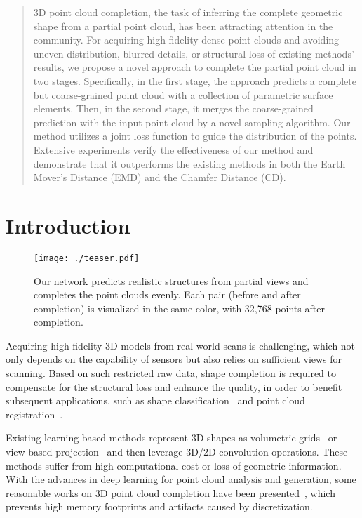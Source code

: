 \documentclass[letterpaper]{article} \usepackage{aaai20}  \usepackage{times}  \usepackage{helvet} \usepackage{courier}  \usepackage[hyphens]{url}  \usepackage{graphicx} \urlstyle{rm} \def\UrlFont{\rm}  \usepackage{graphicx}  \frenchspacing  \setlength{\pdfpagewidth}{8.5in}  \setlength{\pdfpageheight}{11in}  \usepackage{amsmath}
\author{Minghua Liu,\textsuperscript{\rm 1} Lu Sheng,\textsuperscript{\rm 2} Sheng Yang,\textsuperscript{\rm 3} Jing Shao,\textsuperscript{\rm 4} Shi-Min Hu\textsuperscript{\rm 3} \\
\textsuperscript{\rm 1}UC San Diego, 
\textsuperscript{\rm 2}Beihang University, 
\textsuperscript{\rm 3}Tsinghua University, 
\textsuperscript{\rm 4}Sensetime \\
minghua@ucsd.edu, lsheng@buaa.edu.cn, shengyang93fs@gmail.com,\\ shaojing@sensetime.com, shimin@tsinghua.edu.cn
}
\begin{document}
\maketitle

\begin{abstract}
3D point cloud completion, the task of inferring the complete geometric shape from a partial point cloud, has been attracting attention in the community. For acquiring high-fidelity dense point clouds and avoiding uneven distribution, blurred details, or structural loss of existing methods' results, we propose a novel approach to complete the partial point cloud in two stages. Specifically, in the first stage, the approach predicts a complete but coarse-grained point cloud with a collection of parametric surface elements. Then, in the second stage, it merges the coarse-grained prediction with the input point cloud by a novel sampling algorithm. Our method utilizes a joint loss function to guide the distribution of the points. Extensive experiments verify the effectiveness of our method and demonstrate that it outperforms the existing methods in both the Earth Mover's Distance (EMD) and the Chamfer Distance (CD). 
\end{abstract}

\section{Introduction}
\begin{figure}[t]
  \centering
  \texttt{[image: ./teaser.pdf]}
   \caption{
   Our network predicts realistic structures from partial views and completes the point clouds evenly. Each pair (before and after completion) is visualized in the same color, with 32,768 points after completion.}
   \label{denseresult}
\end{figure}
Acquiring high-fidelity 3D models from real-world scans is challenging, which not only depends on the capability of sensors but also relies on sufficient views for scanning. Based on such restricted raw data, shape completion is required to compensate for the structural loss and enhance the quality, in order to benefit subsequent applications, such as shape classification~\cite{Sarmad_2019_CVPR} and point cloud registration~\cite{yuan2018pcn}.

Existing learning-based methods represent 3D shapes as volumetric grids~\cite{dai2017shape,han2017high,Stutz2018} or view-based projection~\cite{park2017transformation} and then leverage 3D/2D convolution operations. These methods suffer from high computational cost or loss of geometric information. With the advances in deep learning for point cloud analysis and generation, some reasonable works on 3D point cloud completion have been presented~\cite{yuan2018pcn,8658987,Sarmad_2019_CVPR,topnet2019}, which prevents high memory footprints and artifacts caused by discretization. 
\end{document}
